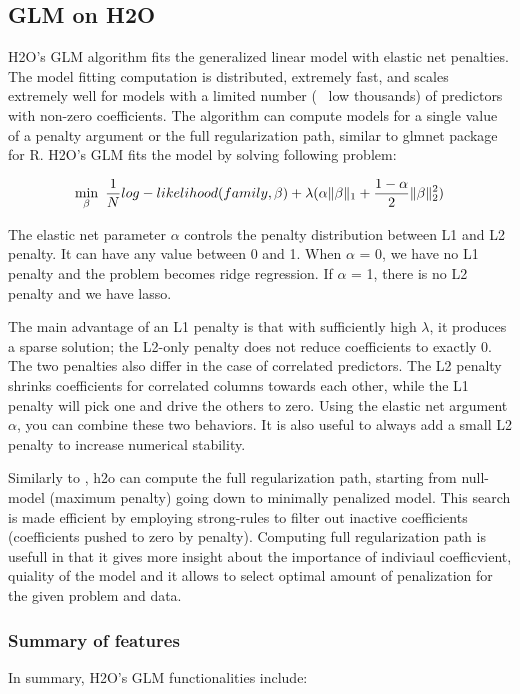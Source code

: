 \documentclass[11pt]{article}
\begin{document}
\subsection{GLM on H2O}
H2O's GLM algorithm fits the generalized linear model with elastic net penalties. The model fitting computation is distributed, extremely fast, and scales extremely well for models with a limited number (~ low thousands) of predictors with non-zero coefficients. The algorithm can compute models for a single value of a penalty argument or the full regularization path, similar to glmnet package for R\cite{glmnet}. 
H2O's GLM fits the model by solving following problem:

\[ \min\limits_{\beta}\ {{1\over{N}} log-likelihood(family,\beta)  + \lambda (\alpha \| \beta \|_1}  + {1- \alpha \over 2} \| \beta \|_2^2) \]

The elastic net parameter $\alpha$ controls the penalty distribution between L1 and L2 penalty. It can have any value between 0 and 1. When $\alpha$ = 0, we have no L1 penalty and the problem becomes ridge regression. If $\alpha$ = 1, there is no L2 penalty and we have lasso.

The main advantage of an L1 penalty is that with sufficiently high $\lambda$, it produces a sparse solution; the L2-only penalty does not reduce coefficients to exactly 0. The two penalties also differ in the case of correlated predictors. The L2 penalty shrinks coefficients for correlated columns towards each other, while the L1 penalty will pick one and drive the others to zero. Using the elastic net argument $\alpha$, you can combine these two behaviors. It is also useful to always add a small L2 penalty to increase numerical stability.

Similarly to \cite{glmnet}, h2o can compute the full regularization path, starting from null-model (maximum penalty) going down to minimally penalized model. This search is made efficient by employing strong-rules \cite{strong} to filter out inactive coefficients (coefficients pushed to zero by penalty). Computing full regularization path is usefull in that it gives more insight about the importance of indiviaul coefficvient, quiality of the model and it allows to select optimal amount of penalization for the given problem and data.


\subsubsection{Summary of features} 
In summary, H2O's GLM functionalities include:
\end{document}
